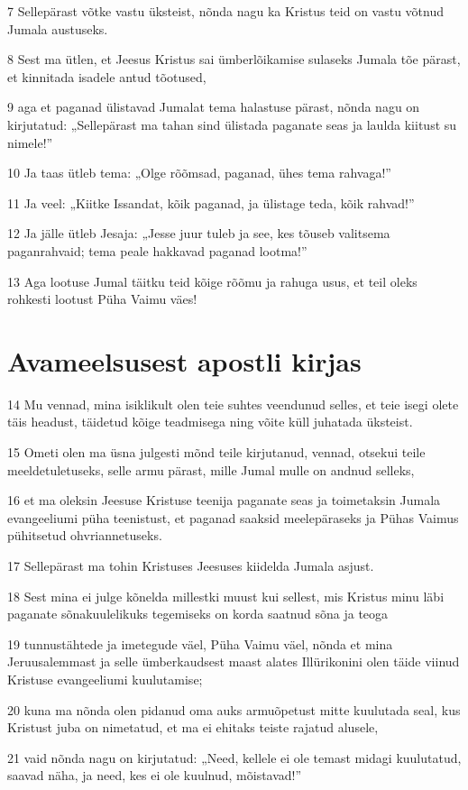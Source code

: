 \par 7 Sellepärast võtke vastu üksteist, nõnda nagu ka Kristus teid on vastu võtnud Jumala austuseks.
\par 8 Sest ma ütlen, et Jeesus Kristus sai ümberlõikamise sulaseks Jumala tõe pärast, et kinnitada isadele antud tõotused,
\par 9 aga et paganad ülistavad Jumalat tema halastuse pärast, nõnda nagu on kirjutatud: „Sellepärast ma tahan sind ülistada paganate seas ja laulda kiitust su nimele!”
\par 10 Ja taas ütleb tema: „Olge rõõmsad, paganad, ühes tema rahvaga!”
\par 11 Ja veel: „Kiitke Issandat, kõik paganad, ja ülistage teda, kõik rahvad!”
\par 12 Ja jälle ütleb Jesaja: „Jesse juur tuleb ja see, kes tõuseb valitsema paganrahvaid; tema peale hakkavad paganad lootma!”
\par 13 Aga lootuse Jumal täitku teid kõige rõõmu ja rahuga usus, et teil oleks rohkesti lootust Püha Vaimu väes!

\section*{Avameelsusest apostli kirjas}

\par 14 Mu vennad, mina isiklikult olen teie suhtes veendunud selles, et teie isegi olete täis headust, täidetud kõige teadmisega ning võite küll juhatada üksteist.
\par 15 Ometi olen ma üsna julgesti mõnd teile kirjutanud, vennad, otsekui teile meeldetuletuseks, selle armu pärast, mille Jumal mulle on andnud selleks,
\par 16 et ma oleksin Jeesuse Kristuse teenija paganate seas ja toimetaksin Jumala evangeeliumi püha teenistust, et paganad saaksid meelepäraseks ja Pühas Vaimus pühitsetud ohvriannetuseks.
\par 17 Sellepärast ma tohin Kristuses Jeesuses kiidelda Jumala asjust.
\par 18 Sest mina ei julge kõnelda millestki muust kui sellest, mis Kristus minu läbi paganate sõnakuulelikuks tegemiseks on korda saatnud sõna ja teoga
\par 19 tunnustähtede ja imetegude väel, Püha Vaimu väel, nõnda et mina Jeruusalemmast ja selle ümberkaudsest maast alates Illürikonini olen täide viinud Kristuse evangeeliumi kuulutamise;
\par 20 kuna ma nõnda olen pidanud oma auks armuõpetust mitte kuulutada seal, kus Kristust juba on nimetatud, et ma ei ehitaks teiste rajatud alusele,
\par 21 vaid nõnda nagu on kirjutatud: „Need, kellele ei ole temast midagi kuulutatud, saavad näha, ja need, kes ei ole kuulnud, mõistavad!”

